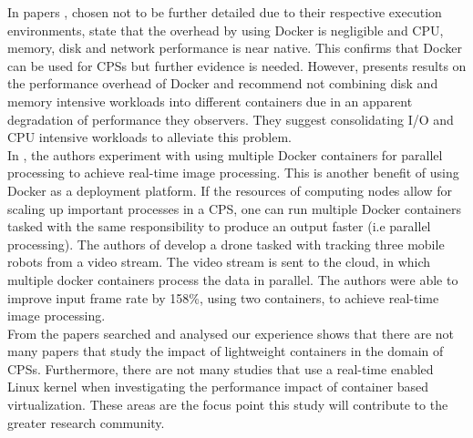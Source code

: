 In papers \cite{p6,p10,p3,p4,p7,p9}, chosen not to be further detailed due to their respective execution environments, state that the overhead by using Docker is negligible and CPU, memory, disk and network performance is near native. This confirms that Docker can be used for CPSs but further evidence is needed. However, \cite{p5} presents results on the performance overhead of Docker and recommend not combining disk and memory intensive workloads into different containers due in an apparent degradation of performance they observers. They suggest consolidating I/O and CPU intensive workloads to alleviate this problem. \\

In \cite{p8}, the authors experiment with using multiple Docker containers for parallel processing to achieve real-time image processing. This is another benefit of using Docker as a deployment platform. If the resources of computing nodes allow for scaling up important processes in a CPS, one can run multiple Docker containers tasked with the same responsibility to produce an output faster (i.e parallel processing). The authors of \cite{p8} develop a drone tasked with tracking three mobile robots from a video stream. The video stream is sent to the cloud, in which multiple docker containers process the data in parallel. The authors were able to improve input frame rate by 158\%, using two containers, to achieve real-time image processing. \\

From the papers searched and analysed our experience shows that there are not many papers that study the impact of lightweight containers in the domain of CPSs. Furthermore, there are not many studies that use a real-time enabled Linux kernel when investigating the performance impact of container based virtualization. These areas are the focus point this study will contribute to the greater research community. 

